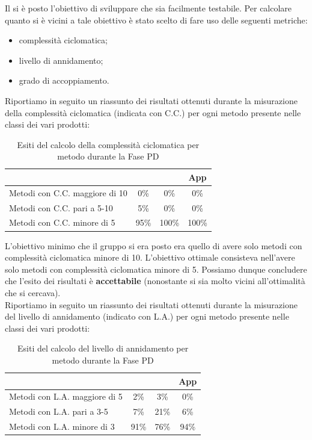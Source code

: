				Il \groupname si è posto l'obiettivo di sviluppare  che sia facilmente testabile. Per calcolare quanto si è vicini a tale obiettivo è stato scelto di fare uso delle seguenti metriche:
				\begin{itemize}
					\item complessità ciclomatica;
					\item livello di annidamento;
					\item grado di accoppiamento.
				\end{itemize}
				Riportiamo in seguito un riassunto dei risultati ottenuti durante la misurazione della complessità ciclomatica (indicata con C.C.) per ogni metodo presente nelle classi dei vari prodotti:
				\begin{table}[H]
					\centering
					\begin{tabu}{| l | c | c | c |}
						\hline
						                                 &    &    & App     \\ \hline \hline
						Metodi con C.C. maggiore di 10   & 0\%      & 0\%     & 0\%     \\ \hline
						Metodi con C.C. pari a 5-10      & 5\%      & 0\%     & 0\%     \\ \hline
						Metodi con C.C. minore di 5      & 95\%     & 100\%   & 100\%   \\ \hline
					\end{tabu}
					\caption{Esiti del calcolo della complessità ciclomatica per metodo durante la Fase PD}
				\end{table}
				L'obiettivo minimo che il gruppo si era posto era quello di avere solo metodi con complessità ciclomatica minore di 10. L'obiettivo ottimale consisteva nell'avere solo metodi con complessità ciclomatica minore di 5. Possiamo dunque concludere che l'esito dei risultati è \textbf{accettabile} (nonostante si sia molto vicini all'ottimalità che si cercava).\\
				Riportiamo in seguito un riassunto dei risultati ottenuti durante la misurazione del livello di annidamento (indicato con L.A.) per ogni metodo presente nelle classi dei vari prodotti:
				\begin{table}[H]
					\centering
					\begin{tabu}{| l | c | c | c |}
						\hline
						                                &    &    & App     \\ \hline \hline
						Metodi con L.A. maggiore di 5   & 2\%      & 3\%     & 0\%     \\ \hline
						Metodi con L.A. pari a 3-5      & 7\%     & 21\%    & 6\%     \\ \hline
						Metodi con L.A. minore di 3     & 91\%     & 76\%    & 94\%   \\ \hline
					\end{tabu}
					\caption{Esiti del calcolo del livello di annidamento per metodo durante la Fase PD}
				\end{table}
